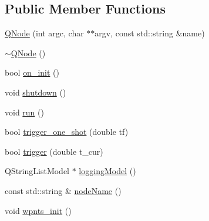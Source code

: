 \subsection*{Public Member Functions}
\begin{DoxyCompactItemize}
\item 
\hyperlink{class_q_node_af26ee8c152283b4a1999dc5d4bd67908}{Q\+Node} (int argc, char $\ast$$\ast$argv, const std\+::string \&name)
\item 
\hyperlink{class_q_node_afed12669e9aed3e70721f507804778ca}{$\sim$\+Q\+Node} ()
\item 
bool \hyperlink{class_q_node_a32d00dbcf15c277e08caabf95af04f6e}{on\+\_\+init} ()
\item 
void \hyperlink{class_q_node_a770568addece696138f515d38408ff5c}{shutdown} ()
\item 
void \hyperlink{class_q_node_ae585b201389c51a177fa5e2fde252c84}{run} ()
\item 
bool \hyperlink{class_q_node_a65f0fc9f27f336150f33b53a7c51d80b}{trigger\+\_\+one\+\_\+shot} (double tf)
\item 
bool \hyperlink{class_q_node_a23bd7e0744ad4c7b5d5464485375bef1}{trigger} (double t\+\_\+cur)
\item 
Q\+String\+List\+Model $\ast$ \hyperlink{class_q_node_a0a6dae02f9e317488095367203fa8a58}{logging\+Model} ()
\item 
const std\+::string \& \hyperlink{class_q_node_ac21ae24311df97ac0e15c97179763b0e}{node\+Name} ()
\item 
void \hyperlink{class_q_node_a2b1b82bfd6e5e6187fe8216ba840bb09}{wpnts\+\_\+init} ()
\end{DoxyCompactItemize}
